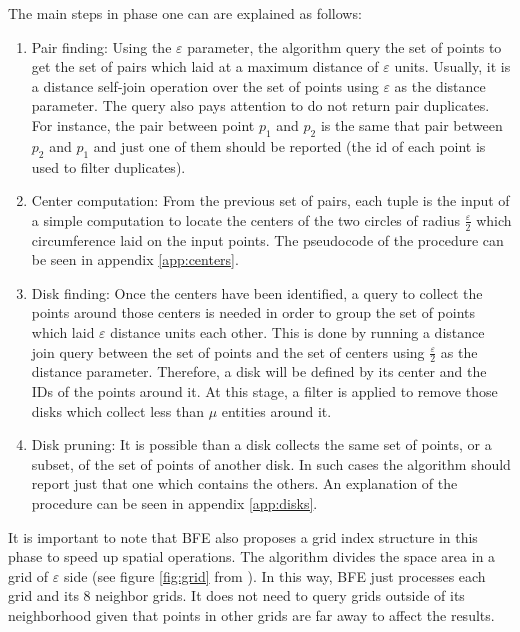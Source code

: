 The main steps in phase one can are explained as follows:
\begin{enumerate}
    \item Pair finding:  Using the $\varepsilon$ parameter, the algorithm query the set of points to get the set of pairs which laid at a maximum distance of $\varepsilon$ units.  Usually, it is a distance self-join operation over the set of points using $\varepsilon$ as the distance parameter.  The query also pays attention to do not return pair duplicates.  For instance, the pair between point $p_1$ and $p_2$ is the same that pair between $p_2$ and $p_1$ and just one of them should be reported (the id of each point is used to filter duplicates).
    \item Center computation:  From the previous set of pairs, each tuple is the input of a simple computation to locate the centers of the two circles of radius $\frac{\varepsilon}{2}$ which circumference laid on the input points.  The pseudocode of the procedure can be seen in appendix \ref{app:centers}.
    \item Disk finding: Once the centers have been identified, a query to collect the points around those centers is needed in order to group the set of points which laid $\varepsilon$ distance units each other.  This is done by running a distance join query between the set of points and the set of centers using $\frac{\varepsilon}{2}$ as the distance parameter. Therefore, a disk will be defined by its center and the IDs of the points around it. At this stage, a filter is applied to remove those disks which collect less than $\mu$ entities around it.
    \item Disk pruning: It is possible than a disk collects the same set of points, or a subset, of the set of points of another disk.  In such cases the algorithm should report just that one which contains the others.  An explanation of the procedure can be seen in appendix \ref{app:disks}.
\end{enumerate}

It is important to note that BFE also proposes a grid index structure in this phase to speed up spatial operations.  The algorithm divides the space area in a grid of $\varepsilon$ side (see figure \ref{fig:grid} from \cite{vieira_2009}).  In this way, BFE just processes each grid and its 8 neighbor grids.  It does not need to query grids outside of its neighborhood given that points in other grids are far away to affect the results.

